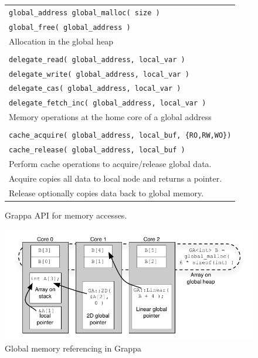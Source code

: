 \begin{figure}[htbp]
  \begin{center}
    \begin{minipage}{\columnwidth}
	\small
	\begin{tabular}{l}
      	\texttt{\scriptsize global\_address global\_malloc( size )} \\
      	\texttt{\scriptsize global\_free( global\_address )} \\ 
      	Allocation in the global heap \\ \\
      	\texttt{\scriptsize delegate\_read( global\_address, local\_var )}  \\
      	\texttt{\scriptsize delegate\_write( global\_address, local\_var )} \\
      	\texttt{\scriptsize delegate\_cas( global\_address, local\_var )} \\
      	\texttt{\scriptsize delegate\_fetch\_inc( global\_address, local\_var )} \\ 
      	Memory operations at the home core of a global address \\ \\
      	\texttt{\scriptsize cache\_acquire( global\_address, local\_buf, \{RO,RW,WO\})} \\
      	\texttt{\scriptsize cache\_release( global\_address, local\_buf )} \\ 
		Perform cache operations to acquire/release global data.  \\
		Acquire copies all data to local node and returns a pointer. \\ 	
		Release optionally copies data back to global memory. \\
	\end{tabular}
      \caption{\label{fig:accessing-memory} Grappa API for memory accesses. }     \end{minipage}
  \end{center}
\end{figure}

\begin{figure}[t]
\begin{center}
  \includegraphics[width=0.95\columnwidth]{figs/memory-structure}
\begin{minipage}{0.95\columnwidth}
  \caption{\label{fig:memory-structure} Global memory referencing in Grappa}
\end{minipage}
\vspace{-3ex}
\end{center}
\end{figure}

